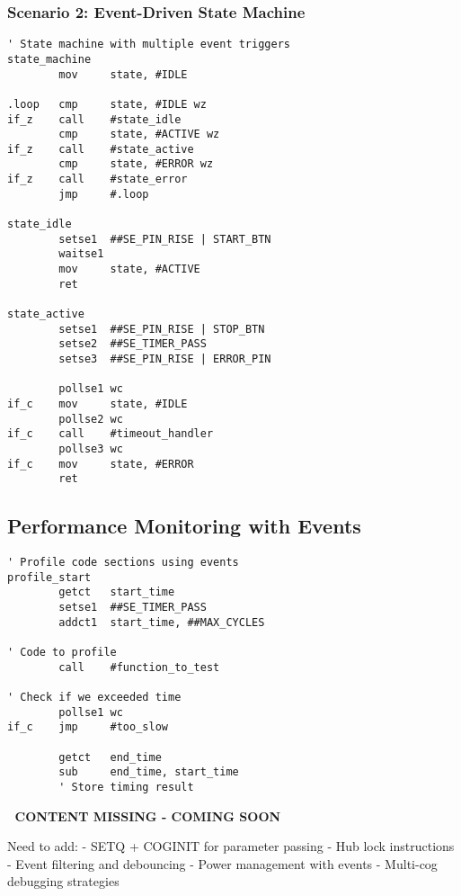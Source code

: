 \documentclass[11pt]{book}
\begin{document}
\hypertarget{scenario-2-event-driven-state-machine}{%
\subsubsection{Scenario 2: Event-Driven State
Machine}\label{scenario-2-event-driven-state-machine}}

\begin{lstlisting}
' State machine with multiple event triggers
state_machine
        mov     state, #IDLE
        
.loop   cmp     state, #IDLE wz
if_z    call    #state_idle
        cmp     state, #ACTIVE wz
if_z    call    #state_active
        cmp     state, #ERROR wz
if_z    call    #state_error
        jmp     #.loop

state_idle
        setse1  ##SE_PIN_RISE | START_BTN
        waitse1
        mov     state, #ACTIVE
        ret

state_active
        setse1  ##SE_PIN_RISE | STOP_BTN
        setse2  ##SE_TIMER_PASS
        setse3  ##SE_PIN_RISE | ERROR_PIN
        
        pollse1 wc
if_c    mov     state, #IDLE
        pollse2 wc
if_c    call    #timeout_handler
        pollse3 wc
if_c    mov     state, #ERROR
        ret
\end{lstlisting}

\hypertarget{performance-monitoring-with-events}{%
\subsection{Performance Monitoring with
Events}\label{performance-monitoring-with-events}}

\begin{lstlisting}
' Profile code sections using events
profile_start
        getct   start_time
        setse1  ##SE_TIMER_PASS
        addct1  start_time, ##MAX_CYCLES
        
' Code to profile
        call    #function_to_test
        
' Check if we exceeded time
        pollse1 wc
if_c    jmp     #too_slow
        
        getct   end_time
        sub     end_time, start_time
        ' Store timing result
\end{lstlisting}

\begin{missing}
🚧 \textbf{CONTENT MISSING - COMING SOON}

Need to add:
- SETQ + COGINIT for parameter passing
- Hub lock instructions
- Event filtering and debouncing
- Power management with events
- Multi-cog debugging strategies
\end{missing}
\end{document}
